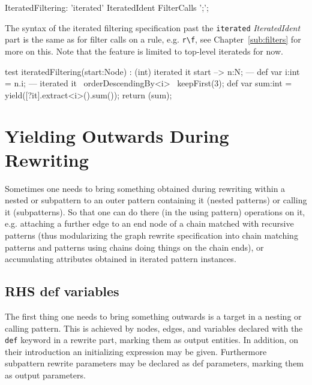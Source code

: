 \begin{rail}
  IteratedFiltering: 
    'iterated' IteratedIdent FilterCalls ';';
\end{rail}

The syntax of the iterated filtering specification past the \texttt{iterated} \emph{IteratedIdent} part is the same as for filter calls on a rule, e.g. \verb#r\f#, see Chapter~\ref{sub:filters} for more on this.
Note that the feature is limited to top-level iterateds for now.

\begin{example}
  \begin{grgen}
test iteratedFiltering(start:Node) : (int)
{
	iterated it {
		start --> n:N;
	---
		def var i:int = n.i;
	} 
---
	iterated it \ orderDescendingBy<i> \ keepFirst(3);
	def var sum:int = yield([?it].extract<i>().sum());
	return (sum);
}
  \end{grgen}
\end{example}



\section{Yielding Outwards During Rewriting} \label{sec:localvarorderedevalyield}

Sometimes one needs to bring something obtained during rewriting within a nested or subpattern to an outer pattern containing it (nested patterns) or calling it (subpatterns).
So that one can do there (in the using pattern) operations on it, e.g. attaching a further edge to an end node of a chain matched with recursive patterns (thus modularizing the graph rewrite specification into chain matching patterns and patterns using chains doing things on the chain ends), or accumulating attributes obtained in iterated pattern instances. 

\subsection{RHS def variables} 

The first thing one needs to bring something outwards is a target in a nesting or calling pattern. 
This is achieved by nodes, edges, and variables declared with the \texttt{def} keyword in a rewrite part, marking them as output entities.
In addition, on their introduction an initializing expression may be given.
Furthermore subpattern rewrite parameters may be declared as def parameters,
marking them as output parameters.

